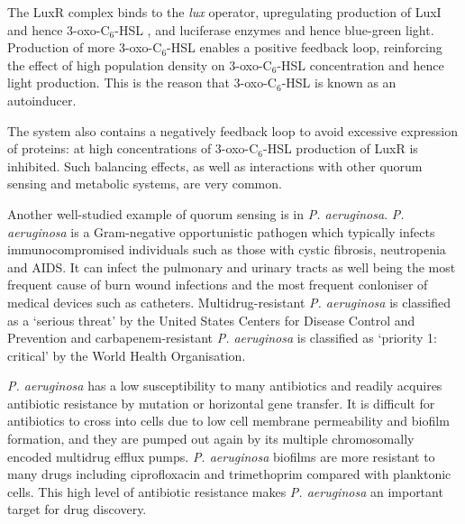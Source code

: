The LuxR complex binds to the \textit{lux} operator, upregulating production of LuxI and hence 3-oxo-C$_6$-HSL , and luciferase enzymes and hence blue-green light\cite{Devine1989,Engebrecht1983,Visick2000}.
Production of more 3-oxo-C$_6$-HSL  enables a positive feedback loop, reinforcing the effect of high population density on 3-oxo-C$_6$-HSL  concentration and hence light production.
This is the reason that 3-oxo-C$_6$-HSL  is known as an autoinducer.

The system also contains a negatively feedback loop to avoid excessive expression of proteins: at high concentrations of 3-oxo-C$_6$-HSL  production of LuxR is inhibited\cite{Dunlap1989}. Such balancing effects, as well as interactions with other quorum sensing and metabolic systems, are very common.


Another well-studied example of quorum sensing is in \textit{P. aeruginosa}\cite{Dubern2008,Hodgkinson2011,Jimenez2012}.
\textit{P. aeruginosa} is a Gram-negative opportunistic pathogen which typically infects immunocompromised individuals such as those with cystic fibrosis, neutropenia and AIDS. It can infect the pulmonary and urinary tracts as well being the most frequent cause of burn wound infections and the most frequent conloniser of medical devices such as catheters\cite{Bodey1983}. Multidrug-resistant \textit{P. aeruginosa} is classified as a `serious threat' by the United States Centers for Disease Control and Prevention\cite{ResistanceUS} and carbapenem-resistant \textit{P. aeruginosa} is classified as `priority 1: critical' by the World Health Organisation\cite{WHO}.

\textit{P. aeruginosa} has a low susceptibility to many antibiotics and readily acquires antibiotic resistance by mutation or horizontal gene transfer\cite{Cornelis2008}.
It is difficult for antibiotics to cross into cells due to low cell membrane permeability\cite{Nikaido1989} and biofilm formation\cite{Evans1991}, and they are pumped out again by its multiple chromosomally encoded multidrug efflux pumps\cite{Poole2004}.
\textit{P. aeruginosa} biofilms are more resistant to many drugs including ciprofloxacin  and trimethoprim  compared with planktonic cells\cite{Evans1991,Olson2002}.
This high level of antibiotic resistance makes \textit{P. aeruginosa} an important target for drug discovery.

